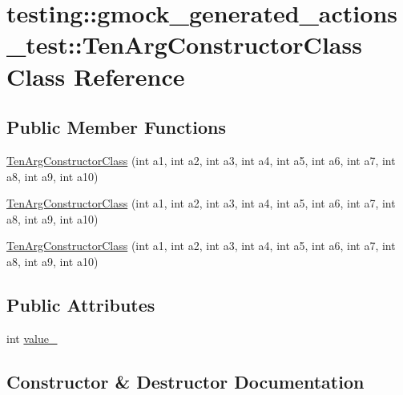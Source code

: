 \hypertarget{classtesting_1_1gmock__generated__actions__test_1_1_ten_arg_constructor_class}{}\section{testing\+::gmock\+\_\+generated\+\_\+actions\+\_\+test\+::Ten\+Arg\+Constructor\+Class Class Reference}
\label{classtesting_1_1gmock__generated__actions__test_1_1_ten_arg_constructor_class}
\subsection*{Public Member Functions}
\begin{DoxyCompactItemize}
\item 
\mbox{\hyperlink{classtesting_1_1gmock__generated__actions__test_1_1_ten_arg_constructor_class_ac17a2190151616f986a193dfe0a03cb5}{Ten\+Arg\+Constructor\+Class}} (int a1, int a2, int a3, int a4, int a5, int a6, int a7, int a8, int a9, int a10)
\item 
\mbox{\hyperlink{classtesting_1_1gmock__generated__actions__test_1_1_ten_arg_constructor_class_ac17a2190151616f986a193dfe0a03cb5}{Ten\+Arg\+Constructor\+Class}} (int a1, int a2, int a3, int a4, int a5, int a6, int a7, int a8, int a9, int a10)
\item 
\mbox{\hyperlink{classtesting_1_1gmock__generated__actions__test_1_1_ten_arg_constructor_class_ac17a2190151616f986a193dfe0a03cb5}{Ten\+Arg\+Constructor\+Class}} (int a1, int a2, int a3, int a4, int a5, int a6, int a7, int a8, int a9, int a10)
\end{DoxyCompactItemize}
\subsection*{Public Attributes}
\begin{DoxyCompactItemize}
\item 
int \mbox{\hyperlink{classtesting_1_1gmock__generated__actions__test_1_1_ten_arg_constructor_class_ae3c388fd7e3cfbb95196712076a368ad}{value\+\_\+}}
\end{DoxyCompactItemize}


\subsection{Constructor \& Destructor Documentation}
\mbox{\label{classtesting_1_1gmock__generated__actions__test_1_1_ten_arg_constructor_class_ac17a2190151616f986a193dfe0a03cb5}} 
